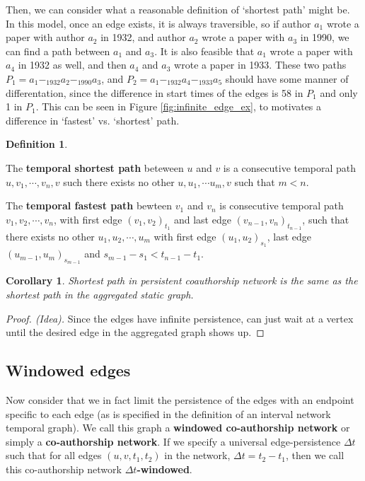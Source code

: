 \documentclass{article}
\newtheorem{cor}[thm]{Corollary}
\theoremstyle{definition}
\newtheorem{defn}[thm]{Definition}
\numberwithin{thm}{subsection}
\begin{document}
Then, we can consider what a reasonable definition of `shortest path' might be.
In this model, once an edge exists, it is always traversible, so if author
$a_1$ wrote a paper with author $a_2$ in 1932, and author $a_2$ wrote a paper with
$a_3$ in 1990, we can find a path between $a_1$ and $a_3$.  It is also feasible
that $a_1$ wrote a paper with $a_4$ in 1932 as well, and then $a_4$ and $a_3$
wrote a paper in 1933. These two paths $P_1 = a_1 -_{1932} a_2 -_{1990} a_3$, and
$P_2 = a_1 -_{1932} a_4 -_{1933} a_5$ should have some manner of differentation,
since the difference in start times of the edges is 58 in $P_1$ and only 1
in $P_1$. This can be seen in Figure \ref{fig:infinite_edge_ex}, to motivates a
difference in `fastest' vs. `shortest' path.


\begin{defn}

  \label{defn:short_fast_path}

  The \textbf{temporal shortest path} beteween $u$ and $v$ is a consecutive
  temporal path $u,v_1,\cdots,v_n,v$ such there exists no other $u,u_1, \cdots
  u_m,v$ such that $m < n$.

  The \textbf{temporal fastest path} bewteen $v_1$ and $v_n$ is consecutive
  temporal path $v_1,v_2,\cdots,v_n$, with first edge $(v_1,v_2)_{t_1}$ and last
  edge $(v_{n-1},v_n)_{t_{n-1}}$, such that there exists no other
  $u_1,u_2, \cdots, u_m$ with first edge $(u_1,u_2)_{s_1}$, last edge
  $(u_{m-1},u_m)_{s_{m-1}}$ and $s_{m-1} - s_1 < t_{n-1} - t_{1}$.
\end{defn}


\begin{cor}
  Shortest path in persistent coauthorship network is the same as the shortest
  path in the aggregated static graph.
\end{cor}

\begin{proof}[Proof. (Idea)]
  Since the edges have infinite persistence, can just wait at a vertex until
  the desired edge in the aggregated graph shows up.
\end{proof}


\subsection{Windowed edges}

Now consider that we in fact limit the persistence of the edges with an endpoint
specific to each edge (as is specified in the definition of an interval network
temporal graph). We call this graph a \textbf{windowed co-authorship network} or
simply a \textbf{co-authorship network}. If we specify a universal
edge-persistence $\Delta t$ such that for all edges $(u,v,t_1,t_2)$ in the
network, $\Delta t = t_2 - t_1$, then we call this co-authorship network
\textbf{$\Delta t$-windowed}.
\end{document}
